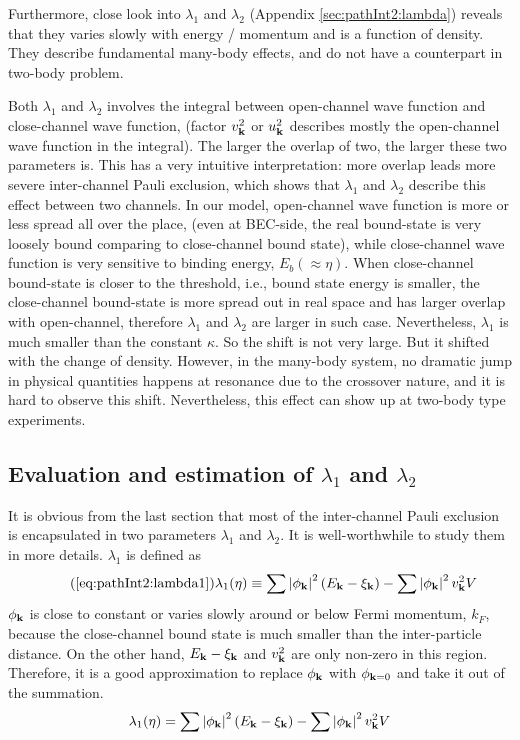 Furthermore,  close look into $\lambda_1$ and $\lambda_2$ (Appendix \ref{sec:pathInt2:lambda}) reveals that they varies slowly with energy / momentum and is a function of density.  They describe  fundamental many-body effects, and do not have a counterpart in two-body problem.  

Both $\lambda_{1}$ and $\lambda_{2}$ involves the integral between open-channel wave function and close-channel wave function, (factor $v_{\mathbf{k}}^{2}$ or $u_{\mathbf{k}}^{2}$ describes mostly the open-channel wave function in the integral). The larger the overlap of two, the larger these two parameters is.  This has a very intuitive interpretation:  more overlap leads more severe inter-channel Pauli exclusion, which shows that $\lambda_{1}$ and $\lambda_{2}$ describe this effect between two  channels.  In our model, open-channel wave function is more or less spread all over the place, (even at BEC-side, the real bound-state is very loosely bound comparing to close-channel bound state), while close-channel wave function is very sensitive to binding energy, $E_{b}(\approx\eta)$.  When  close-channel  bound-state is closer to the threshold, i.e.,  bound state energy  is smaller, the close-channel bound-state is more spread out  in real space and has larger overlap with open-channel, therefore $\lambda_{1}$ and $\lambda_{2}$ are larger in such case.                           Nevertheless, $\lambda_1$ is much smaller than the  constant $\kappa$.  So the shift is not very large.  But it shifted with the change of density.  However, in the many-body system, no dramatic jump in physical quantities happens at resonance due to the crossover nature, and it is hard to observe this shift.  Nevertheless, this effect can show up at two-body type experiments.  


\subsection{Evaluation and estimation of $\lambda_{1}$ and $\lambda_{2}$\label{sec:pathInt2:lambda}}
It is obvious from the last section that most of the inter-channel Pauli exclusion is encapsulated in two parameters $\lambda_{1}$ and $\lambda_{2}$.   It is well-worthwhile to study them in more details.  $\lambda_{1}$ is defined as 
\begin{equation}\tag{\ref{eq:pathInt2:lambda1}}
\lambda_{1}(\eta)\equiv\sum\abs{\phi_{\vk}}^{2}{(E_{\vk}-\xi_{\vk})}-\sum\abs{\phi_{\vk}}^{2}{v_{\vk}^{2}V}
\end{equation}
$\phi_{\mathbf{k}}$ is close to constant or varies slowly around or below Fermi momentum, $k_{F}$, because the close-channel bound state is much smaller than the inter-particle distance.  On the other hand, $E_{\mathbf{k}}-\xi_{\mathbf{k}}$ and $v_{\mathbf{k}}^{2}$  are only non-zero in this region.  Therefore, it is a good approximation to replace $\phi_{\mathbf{k}}$ with $\phi_{\mathbf{k}=0}$ and take it out of the summation.  
\begin{equation*}
\lambda_{1}(\eta)=\sum\left\lvert{\phi_{\ensuremath{\mathbf{k}}}}\right\rvert^{2}{(E_{\mathbf{k}}-\xi_{\mathbf{k}})}-\sum\left\lvert{\phi_{\ensuremath{\mathbf{k}}}}\right\rvert^{2}{v_{\mathbf{k}}^{2}V}
\end{equation*}

